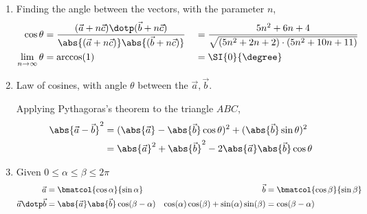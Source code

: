 \begin{enumerate}
      \item Finding the angle between the vectors, with the parameter $ n $,
            \begin{align}
                  \cos \theta                       & = \frac{(\vec{a} + n\vec{c}) \dotp
                        (\vec{b} + n\vec{c})}
                  {\abs{(\vec{a} + n\vec{c})}
                  \abs{(\vec{b} + n\vec{c})}}       &
                                                    & =\frac{5n^2 + 6n + 4}
                  {\sqrt{(5n^2 + 2n + 2) \cdot (5n^2 + 10n + 11)}}                         \\
                  \lim_{n \rightarrow \infty}\theta & = \arccos(1)                       &
                                                    & = \SI{0}{\degree}
            \end{align}

      \item Law of cosines, with angle $ \theta $ between the $ \vec{a}, \vec{b} $. \par
            Applying Pythagoras's theorem to the triangle $ ABC $,
            \begin{align}
                  \abs{\vec{a} - \vec{b}}^2 & = (\abs{\vec{a}} -
                  \abs{\vec{b}}\cos \theta)^2 + (\abs{\vec{b}}\sin \theta)^2      \\
                                            & = \abs{\vec{a}}^2 + \abs{\vec{b}}^2
                  - 2\abs{\vec{a}} \abs{\vec{b}} \cos \theta
            \end{align}
            \begin{figure}[H]
                  \centering
            \end{figure}

      \item Given $ 0 \leq \alpha \leq \beta \leq 2\pi $
            \begin{align}
                  \vec{a}                                            &
                  = \bmatcol{\cos \alpha}{\sin \alpha}               & \vec{b} &
                  = \bmatcol{\cos \beta}{\sin \beta}                             \\
                  \vec{a} \dotp \vec{b}                              &
                  = \abs{\vec{a}} \abs{\vec{b}} \cos(\beta - \alpha) &
                  \cos(\alpha)\cos(\beta) + \sin(\alpha)\sin(\beta)  & =
                  \cos(\beta - \alpha)
            \end{align}


\end{enumerate}
